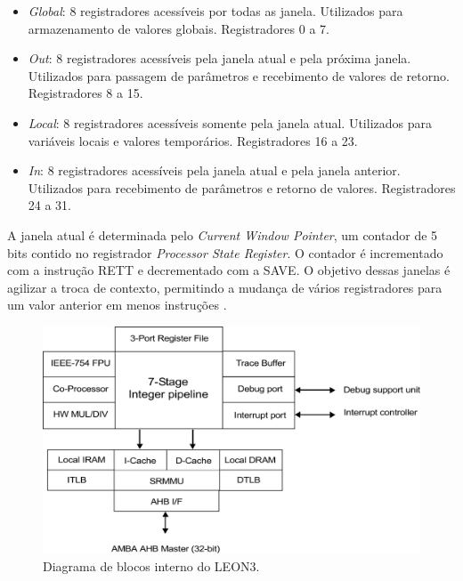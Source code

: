 \begin{itemize}
	\item \textit{Global}: 8 registradores acessíveis por todas as janela. Utilizados para armazenamento de valores globais. Registradores 0 a 7.
	\item \textit{Out}: 8 registradores acessíveis pela janela atual e pela próxima janela. Utilizados para passagem de parâmetros e recebimento de valores de retorno. Registradores 8 a 15.
	\item \textit{Local}: 8 registradores acessíveis somente pela janela atual. Utilizados para variáveis locais e valores temporários. Registradores 16 a 23.
	\item \textit{In}: 8 registradores acessíveis pela janela atual e pela janela anterior. Utilizados para recebimento de parâmetros e retorno de valores. Registradores 24 a 31.
\end{itemize}

A janela atual é determinada pelo \textit{Current Window Pointer}, um contador de 5 bits contido no registrador \textit{Processor State Register}. O contador é incrementado com a instrução RETT e decrementado com a SAVE. O objetivo dessas janelas é agilizar a troca de contexto, permitindo a mudança de vários registradores para um valor anterior em menos instruções \cite{sparcmanual}.

\begin{figure}
	\label{Fig:Leon3Interno}
	\caption[Diagrama de blocos interno do LEON3]{
		Diagrama de blocos interno do LEON3.}
	\begin{center}
		\includegraphics[width=\linewidth]{fig/leon3interno.pdf}
	\end{center}
\end{figure}

